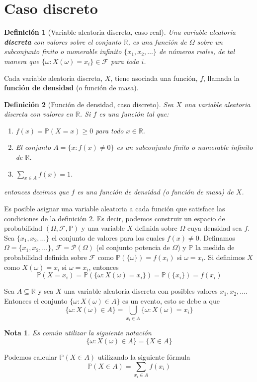 \documentclass[11pt]{report}
\theoremstyle{break}
\newtheorem{definicion}{Definición}[chapter]
\newtheorem{nota}{Nota}[chapter]
\theoremstyle{break}
\begin{document}
\section{Caso discreto}
\label{seccion:variables discretas}
\begin{definicion}[Variable aleatoria discreta, caso real]
Una variable aleatoria \textbf{discreta} con valores sobre el conjunto $\mathbb{R}$, es una función de $\Omega$ sobre un subconjunto finito o numerable infinito $\{x_1, x_2, \ldots\}$ de números reales, de tal manera que $\{\omega: X(\omega) = x_i \} \in \mathcal{F}$ para toda $i$.
\end{definicion}
Cada variable aleatoria discreta, $X$, tiene asociada una función, $f$, llamada la \textbf{función de densidad} (o función de masa).

\begin{definicion}[Función de densidad, caso discreto]
\label{definicion:funcion de densidad, caso discreto}
Sea $X$ una variable aleatoria discreta con valores en $\mathbb{R}$. Si $f$ es una función tal que:
\begin{enumerate}[label=\alph*)]
\item $f(x) = \mathbb{P}(X = x) \geq 0$ para todo $x \in \mathbb{R}$.
\item El conjunto $A = \{x: f(x) \neq 0 \}$ es un subconjunto finito o numerable infinito de $\mathbb{R}$.
\item $\sum_{x \in A} f(x) = 1$.
\end{enumerate}
entonces decimos que $f$ es una función de densidad (o función de masa) de $X$.
\end{definicion}

Es posible asignar una variable aleatoria a cada función que satisface las condiciones de la definición \ref{definicion:funcion de densidad, caso discreto}. Es decir, podemos construir un espacio de probabilidad $(\Omega, \mathcal{F}, \mathbb{P})$ y una variable $X$ definida sobre $\Omega$ cuya densidad sea $f$. Sea $\{x_1, x_2, \ldots \}$ el conjunto de valores para los cuales $f(x) \neq 0$. Definamos $\Omega = \{x_1, x_2, \ldots \}$, $\mathcal{F} = \mathcal{P}(\Omega)$ (el conjunto potencia de $\Omega$) y $\mathbb{P}$ la medida de probabilidad definida sobre $\mathcal{F}$ como $\mathbb{P}( \{\omega \} ) = f(x_i)$ si $\omega = x_i$. Si definimos $X$ como $X(\omega) = x_i$ si $\omega = x_i$, entonces
$$
\mathbb{P}(X = x_i) = \mathbb{P}(\{\omega: X(\omega) = x_i \}) = \mathbb{P}(\{x_i\}) = f(x_i)
$$

Sea $A \subseteq \mathbb{R}$ y sea $X$ una variable aleatoria discreta con posibles valores $x_1, x_2, \ldots$. Entonces el conjunto $\{\omega: X(\omega) \in A  \}$ es un evento, esto se debe a que
$$
\{\omega: X(\omega) \in A  \} = \bigcup_{x_i \in A} \{\omega: X(\omega) = x_i \}
$$
\begin{nota}
Es común utilizar la siguiente notación
$$
\{\omega: X(\omega) \in A  \} = \{X \in A\}
$$
\end{nota}
Podemos calcular $\mathbb{P}(X \in A)$ utilizando la siguiente fórmula
$$
\mathbb{P}(X \in A) = \sum_{x_i \in A}f(x_i)
$$
\end{document}
